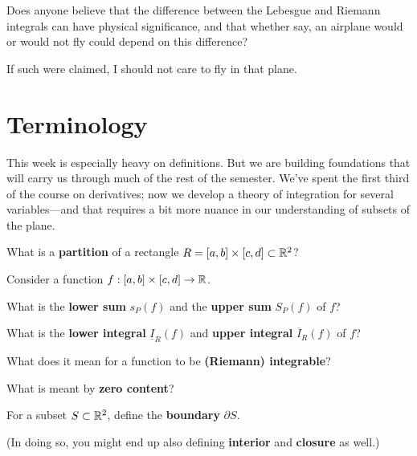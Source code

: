 \documentclass{homework}
\author{Jim Fowler}
\begin{document}
\maketitle

\begin{inspiration}
  Does anyone believe that the difference between the Lebesgue and Riemann integrals can have physical significance, and that whether say, an airplane would or would not fly could depend on this difference?

  If such were claimed, I should not care to fly in that plane.
\end{inspiration}

\section{Terminology}

{\footnotesize This week is especially heavy on definitions. But we are building foundations that will carry us through much of the rest of the semester. We've spent the first third of the course on derivatives; now we develop a theory of integration for several variables---and that requires a bit more nuance in our understanding of subsets of the plane.}

\begin{problem}
  What is a \textbf{partition} of a rectangle $R=[a,b]\times[c,d]\subset\mathbb{R}^2$?
\end{problem}

\begin{problem}
  Consider a function  $f : [a,b] \times [c,d] \to \mathbb{R}$.
  
What is the \textbf{lower sum} $s_P(f)$ and the \textbf{upper sum} $S_P(f)$ of $f$?

What is the \textbf{lower integral} $\underline{I}_R(f)$ and \textbf{upper integral} $\overline{I}_R(f)$ of $f$?
\end{problem}
  
\begin{problem}
  What does it mean for a function to be \textbf{(Riemann) integrable}?
\end{problem}

\begin{problem}
  What is meant by \textbf{zero content}?
\end{problem}

\begin{problem}\label{define-boundary}%
  For a subset $S \subset \mathbb{R}^2$, define the \textbf{boundary} $\partial S$.

  (In doing so, you might end up also defining \textbf{interior} and \textbf{closure} as well.)
\end{problem}
\end{document}
